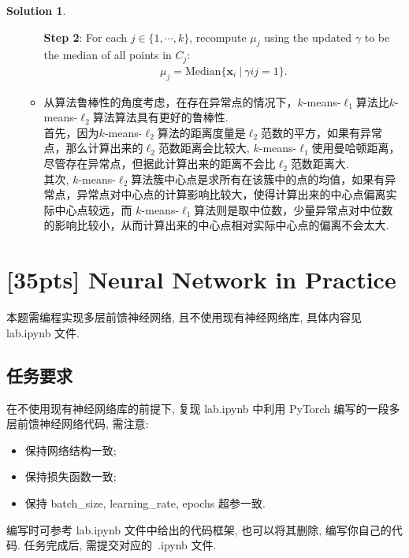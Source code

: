 \documentclass[a4paper,UTF8]{article}
\numberwithin{equation}{section}
\numberwithin{equation}{section}
\theoremstyle{definition}
\newtheorem*{solution}{Solution}
\begin{document}
\begin{solution}
\begin{enumerate}
\begin{itemize}
\begin{algorithm}[]
{                \textbf{Step 2}: For each $j \in \{1, \cdots, k\}$, recompute $\mu_j$ using the updated $\gamma$ to be the median of all points in $C_j$: 
                \begin{align*}
                \mu_j = \text{Median}\{\mathbf x_i\ | \ \gamma{ij} = 1\}.
                \end{align*}
                }
            \end{algorithm}
            \item 从算法鲁棒性的角度考虑，在存在异常点的情况下，$k$-means-$\ell_1$算法比$k$-means-$\ell_2$算法算法具有更好的鲁棒性. \\
            首先，因为$k$-means-$\ell_2$算法的距离度量是$\ell_2$范数的平方，如果有异常点，那么计算出来的$\ell_2$范数距离会比较大,  $k$-means-$\ell_1$使用曼哈顿距离，尽管存在异常点，但据此计算出来的距离不会比$\ell_2$范数距离大.\\
            其次, $k$-means-$\ell_2$算法簇中心点是求所有在该簇中的点的均值，如果有异常点，异常点对中心点的计算影响比较大，使得计算出来的中心点偏离实际中心点较远，而
            $k$-means-$\ell_1$算法则是取中位数，少量异常点对中位数的影响比较小，从而计算出来的中心点相对实际中心点的偏离不会太大.
        \end{itemize}
    \end{enumerate}
\end{solution}

\newpage

\section{[35pts] Neural Network in Practice}

本题需编程实现多层前馈神经网络, 且不使用现有神经网络库, 具体内容见 lab.ipynb 文件.

\subsection{任务要求}

在不使用现有神经网络库的前提下, 复现 lab.ipynb 中利用 PyTorch 编写的一段多层前馈神经网络代码, 需注意:
\begin{itemize}
    \item 保持网络结构一致;
    \item 保持损失函数一致;
    \item 保持 batch\_size, learning\_rate, epochs 超参一致.
\end{itemize}
编写时可参考 lab.ipynb 文件中给出的代码框架, 也可以将其删除, 编写你自己的代码. 任务完成后, 需提交对应的~.ipynb 文件.
\end{document}
